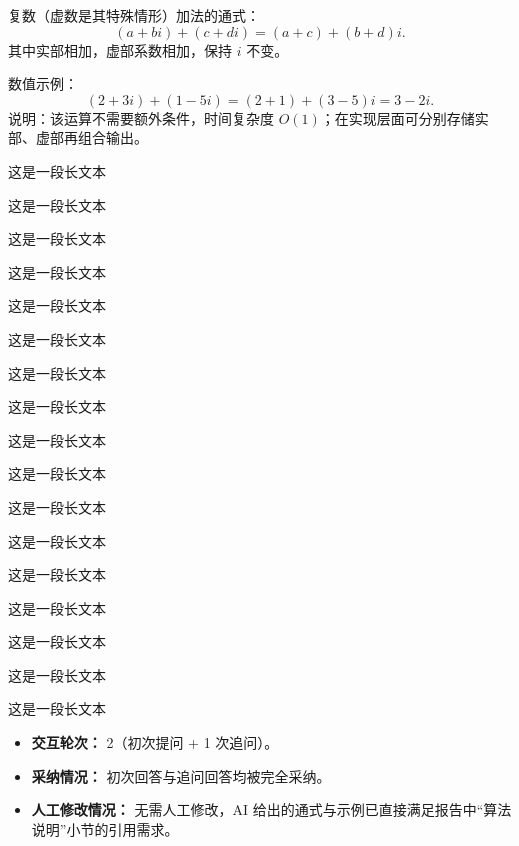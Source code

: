 \begin{GeminiBlock}
复数（虚数是其特殊情形）加法的通式：
\[
(a+bi) + (c+di) = (a+c) + (b+d)i.
\]
其中实部相加，虚部系数相加，保持 $i$ 不变。

数值示例：
\[
(2+3i) + (1-5i) = (2+1) + (3-5)i = 3 - 2i.
\]
说明：该运算不需要额外条件，时间复杂度 $O(1)$；在实现层面可分别存储实部、虚部再组合输出。

这是一段长文本

这是一段长文本



这是一段长文本

这是一段长文本

这是一段长文本

这是一段长文本

这是一段长文本

这是一段长文本

这是一段长文本

这是一段长文本

这是一段长文本

这是一段长文本

这是一段长文本

这是一段长文本

这是一段长文本

这是一段长文本

这是一段长文本
\end{GeminiBlock}

\begin{tcolorbox}[colback=green!10, colframe=green!50, title={\textcolor{black}{采纳和人工修改情况}}]
\begin{itemize}
    \item \textbf{交互轮次：} 2（初次提问 + 1 次追问）。
    \item \textbf{采纳情况：} 初次回答与追问回答均被完全采纳。
    \item \textbf{人工修改情况：} 无需人工修改，AI 给出的通式与示例已直接满足报告中“算法说明”小节的引用需求。
\end{itemize}
\end{tcolorbox}
